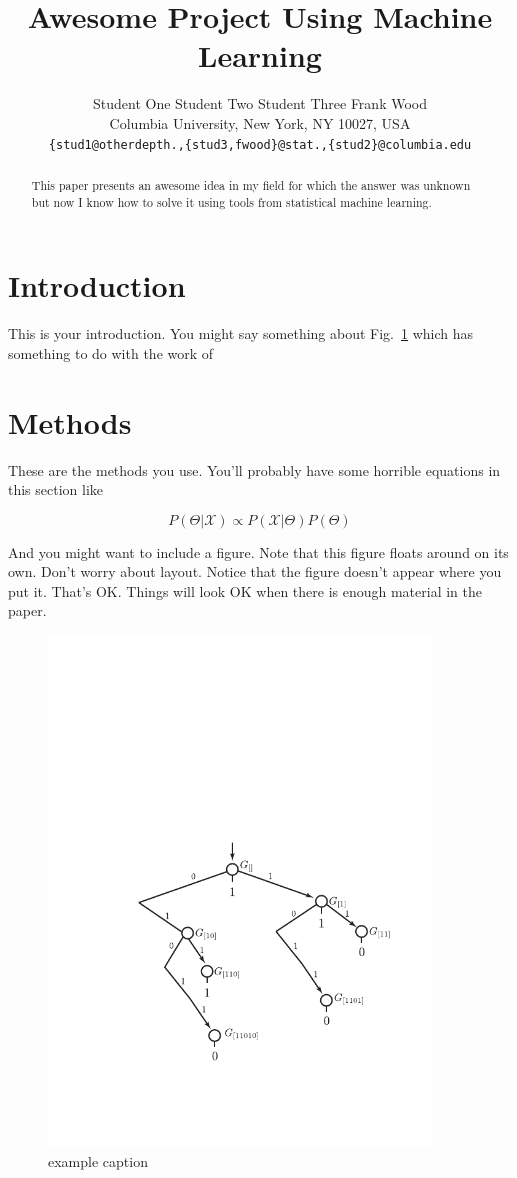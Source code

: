 \documentclass{article}
\title{Awesome Project Using Machine Learning}
\author{
Student One \hspace{1cm} Student Two \hspace{1cm} Student Three \hspace{1cm} Frank Wood\\
Columbia University, New York, NY 10027, USA \\
\texttt{\{stud1@otherdepth.,\{stud3,fwood\}@stat.,\{stud2\}@columbia.edu}
}
\newcommand{\X}{\mathcal{X}}
\begin{document}
\maketitle

\begin{abstract}
This paper presents an awesome idea in my field for which the answer was unknown but now I know how to solve it using tools from statistical machine learning.  
\end{abstract}

\section{Introduction}
\label{sec:introduction}
This is your introduction.  You might say something about Fig.~\ref{fig:example} which has something to do with the work of \citep{Wood2009}
\section{Methods}
These are the methods you use.  You'll probably have some horrible equations in this section like

\begin{equation}
P(\Theta|\X) \propto P(\X|\Theta) P(\Theta) %
\label{eqn:bayes_rule}
\end{equation}

And you might want to include a figure.  Note that this figure floats around on its own.  Don't worry about layout.  Notice that the figure doesn't appear where you put it.  That's OK.  Things will look OK when there is enough material in the paper.

\begin{figure}[htbp] %
   \centering
   \includegraphics[width=4in]{fig1} 
   \caption{example caption}
   \label{fig:example}
\end{figure}
\end{document}
